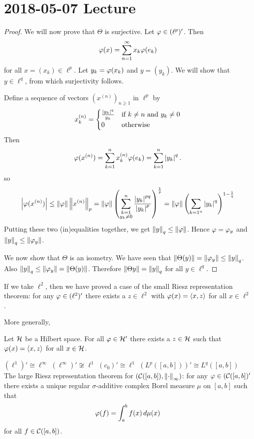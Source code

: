 \section{2018-05-07 Lecture}

\begin{proof}
  We will now prove that $\Theta$ is surjective.
  Let $\varphi \in (\ell^p)'$.
  Then
  \[\varphi(x) = \sum_{n=1}^\infty x_k\varphi(e_k)\]
  for all $x=(x_k)\in\ell^p$.
  Let $y_k=\varphi(x_k)$ and $y=(y_k)$.
  We will show that $y \in \ell^q$, from which surjectivity follows.

  Define a sequence of vectors $(x^{(n)})_{n \geq 1}$ in $\ell^p$ by
  \[x_k^{(n)}=
    \begin{cases}
      \frac{\left\lvert y_k \right\rvert^q}{y_k} & \text{if } k \neq n \text{ and } y_k \neq 0 \\
      0 & \text{otherwise}
    \end{cases}
  \]
  Then
  \[\varphi(x^{(n)}) = \sum_{k=1}^n x_k^{(n)}\varphi(e_k) = \sum_{k=1}^n \left\lvert y_k \right\rvert^q.\]
  so
  \[\left\lvert \varphi(x^{(n)}) \right\rvert \leq \left\lVert \varphi \right\rVert \left\lVert x^{(n)} \right\rVert_p = \left\lVert \varphi \right\rVert \left( \sum_{\substack{k=1 \\ y_k \neq 0}}^n \frac{\left\lvert y_k \right\rvert^{pq}}{\left\lvert y_k \right\rvert^p} \right)^\frac{1}{p} = \left\lVert \varphi \right\rVert \left( \sum_{k=1^n} \left\lvert y_k \right\rvert^q \right)^{1-\frac 1q}\]
  Putting these two (in)equalities together, we get $\left\lVert y \right\rVert_q \leq \left\lVert \varphi \right\rVert$.
  Hence $\varphi=\varphi_y$ and $\left\lVert y \right\rVert_q \leq \left\lVert \varphi_y \right\rVert$.

  We now show that $\Theta$ is an isometry.
  We have seen that $\left\lVert \Theta(y) \right\rVert=\left\lVert \varphi_y \right\rVert\leq\left\lVert y \right\rVert_q$.
  Also $\left\lVert y \right\rVert_q\leq\left\lVert \varphi_y \right\rVert=\left\lVert \Theta(y) \right\rVert$.
  Therefore $\left\lVert \Theta{y} \right\rVert=\left\lVert y \right\rVert_q$ for all $y \in \ell^q$.
\end{proof}

\begin{rmk}
  If we take $\ell^2$, then we have proved a case of the small Riesz representation theorem: for any $\varphi \in (\ell^2)'$ there exists a $z \in \ell^2$ with $\varphi(x) = {\left\langle x,z \right\rangle}$ for all $x \in \ell^2$.
\end{rmk}

More generally,
\begin{thm}
  Let $\mathcal{H}$ be a Hilbert space. For all $\varphi \in \mathcal{H}'$ there exists a $z \in \mathcal{H}$ such that $\varphi(x)={\left\langle x,z \right\rangle}$ for all $x \in \mathcal{H}$.
\end{thm}

\begin{exam}
  \leavevmode
  \begin{enum}
    \io $(\ell^1)' \cong \ell^\infty$
    \io $(\ell^\infty)' \not\cong \ell^1$
    \io $(c_0)' \cong \ell^1$
    \io $(L^p([a,b]))' \cong L^q([a,b])$
    \io The large Riesz representation theorem for $(\mathcal{C}([a,b]),\left\lVert \cdot \right\rVert_\infty)$: for any $\varphi \in (\mathcal{C}([a,b])'$ there exists a unique regular $\sigma$-additive complex Borel measure $\mu$ on $[a,b]$ such that
      \[\varphi(f) = \int_a^b f(x) \, d\mu(x)\]
      for all $f \in \mathcal{C}([a,b])$.
  \end{enum}
\end{exam}

